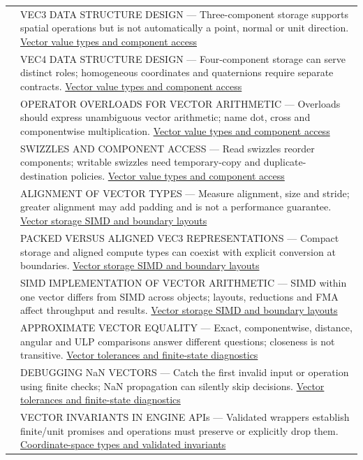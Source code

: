 {\begin{longtable}[]{@{}
  >{\raggedright\arraybackslash}p{}
  >{\raggedright\arraybackslash}p{}@{}}
589 & VEC3 DATA STRUCTURE DESIGN --- Three-component storage supports spatial operations but is not automatically a point, normal or unit direction. \hyperref[appendix-37a39984ba66]{Vector value types and component access} \\
590 & VEC4 DATA STRUCTURE DESIGN --- Four-component storage can serve distinct roles; homogeneous coordinates and quaternions require separate contracts. \hyperref[appendix-37a39984ba66]{Vector value types and component access} \\
591 & OPERATOR OVERLOADS FOR VECTOR ARITHMETIC --- Overloads should express unambiguous vector arithmetic; name dot, cross and componentwise multiplication. \hyperref[appendix-37a39984ba66]{Vector value types and component access} \\
592 & SWIZZLES AND COMPONENT ACCESS --- Read swizzles reorder components; writable swizzles need temporary-copy and duplicate-destination policies. \hyperref[appendix-37a39984ba66]{Vector value types and component access} \\
593 & ALIGNMENT OF VECTOR TYPES --- Measure alignment, size and stride; greater alignment may add padding and is not a performance guarantee. \hyperref[appendix-26bf6bf2fb8b]{Vector storage SIMD and boundary layouts} \\
594 & PACKED VERSUS ALIGNED VEC3 REPRESENTATIONS --- Compact storage and aligned compute types can coexist with explicit conversion at boundaries. \hyperref[appendix-26bf6bf2fb8b]{Vector storage SIMD and boundary layouts} \\
595 & SIMD IMPLEMENTATION OF VECTOR ARITHMETIC --- SIMD within one vector differs from SIMD across objects; layouts, reductions and FMA affect throughput and results. \hyperref[appendix-26bf6bf2fb8b]{Vector storage SIMD and boundary layouts} \\
596 & APPROXIMATE VECTOR EQUALITY --- Exact, componentwise, distance, angular and ULP comparisons answer different questions; closeness is not transitive. \hyperref[appendix-b5b83329215b]{Vector tolerances and finite-state diagnostics} \\
597 & DEBUGGING NaN VECTORS --- Catch the first invalid input or operation using finite checks; NaN propagation can silently skip decisions. \hyperref[appendix-b5b83329215b]{Vector tolerances and finite-state diagnostics} \\
598 & VECTOR INVARIANTS IN ENGINE APIs --- Validated wrappers establish finite/unit promises and operations must preserve or explicitly drop them. \hyperref[appendix-380a220e2529]{Coordinate-space types and validated invariants} \\

\end{longtable}}
